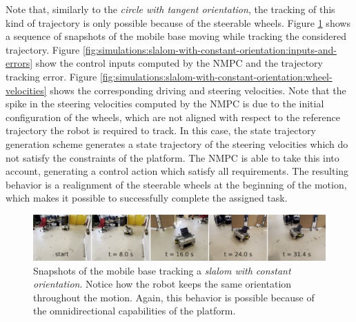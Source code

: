 Note that, similarly to the \textit{circle with tangent orientation},
the tracking of this kind of trajectory is only possible because of the
steerable wheels.
Figure \ref{fig:experiments:slalom-with-constant-orientation:snapshots} shows
a sequence of snapshots of the mobile base moving while tracking the considered
trajectory.
Figure \ref{fig:simulations:slalom-with-constant-orientation:inputs-and-errors}
show the control inputs computed by the NMPC and the trajectory tracking error.
Figure \ref{fig:simulations:slalom-with-constant-orientation:wheel-velocities} 
shows the corresponding driving and steering velocities. Note that the spike 
in the steering velocities computed by the NMPC is due to the initial 
configuration of the wheels, which are not aligned with respect to the 
reference trajectory the robot is required to track.
In this case, the state trajectory generation scheme 
generates a state trajectory of the steering velocities which do not 
satisfy the constraints of the platform. The NMPC is able to take this into 
account, generating a control action which satisfy all requirements. The
resulting behavior is a realignment of the steerable wheels at the beginning of 
the motion, which makes it possible to successfully complete the assigned task.
\begin{figure}
    \centering
    \includegraphics[width=\textwidth]{figures/SWMR/simulations/slalom_with_constant_orientation/snapshots.jpeg}
    \caption{Snapshots of the mobile base tracking a
        \textit{slalom with constant orientation}. Notice how the robot keeps 
        the same orientation throughout the motion. Again, this behavior
        is possible because of the omnidirectional capabilities of the platform.
    }
    \label{fig:experiments:slalom-with-constant-orientation:snapshots}
\end{figure}
